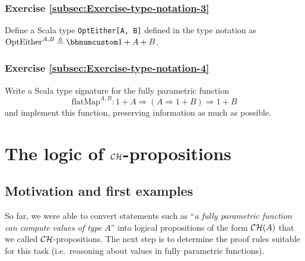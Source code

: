 \subsubsection{Exercise \label{subsec:Exercise-type-notation-3}\ref{subsec:Exercise-type-notation-3}}

Define a Scala type \lstinline!OptEither[A, B]!
defined in the type notation as $\text{OptEither}^{A,B}\triangleq\bbnum 1+A+B$.

\subsubsection{Exercise \label{subsec:Exercise-type-notation-4}\ref{subsec:Exercise-type-notation-4}}

Write a Scala type signature for the fully parametric function 
\[
\text{flatMap}^{A,B}:1+A\Rightarrow\left(A\Rightarrow1+B\right)\Rightarrow1+B
\]
and implement this function, preserving information as much as possible.

\section{The logic of ${\cal CH}$-propositions}

\subsection{Motivation and first examples}

So far, we were able to convert statements such as ``\emph{a fully
parametric function can compute values of type} $A$'' into logical
propositions of the form ${\cal CH}(A)$ that we called ${\cal CH}$-propositions.
The next step is to determine the proof rules suitable for this task
(i.e.~reasoning about values in fully parametric functions).

